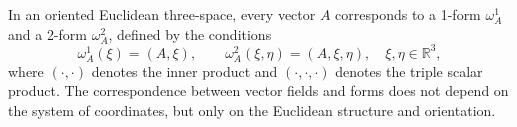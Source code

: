 In an oriented Euclidean three-space, every vector $A$ corresponds to a 1-form $\omega_A^1$ and a 2-form $\omega_A^2$, defined by the conditions
$$\omega_A^1(\xi) = (A, \xi), \qquad \omega_A^2(\xi, \eta) = (A, \xi, \eta), \quad \xi, \eta \in \mathbb{R}^3,$$
where $(\cdot, \cdot)$ denotes the inner product and $(\cdot, \cdot, \cdot)$ denotes the triple scalar product. The correspondence between vector fields and forms does not depend on the system of coordinates, but only on the Euclidean structure and orientation.
